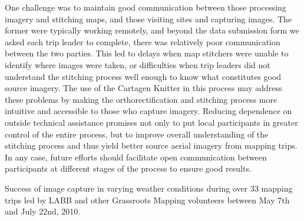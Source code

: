 \documentclass[11pt,oneside,notitlepage]{report}
\begin{document}
{{One challenge was to maintain good communication between those processing imagery and stitching maps, and those visiting sites and capturing images. The former were typically working remotely, and beyond the data submission form we asked each trip leader to complete, there was relatively poor communication between the two parties. This led to delays when map stitchers were unable to identify where images were taken, or difficulties when trip leaders did not understand the stitching process well enough to know what constitutes good source imagery. The use of the Cartagen Knitter in this process may address these problems by making the orthorectification and stitching process more intuitive and accessible to those who capture imagery. Reducing dependence on outside technical assistance promises not only to put local participants in greater control of the entire process, but to improve overall understanding of the stitching process and thus yield better source aerial imagery from mapping trips. In any case, future efforts should facilitate open communication between participants at different stages of the process to ensure good results.

\begin{table}[tp] 
\caption{Success of image capture in varying weather conditions during over 33 mapping trips led by \ac{LABB} and other Grassroots Mapping volunteers between May 7th and July 22nd, 2010.}


\end{table}}}
\end{document}
